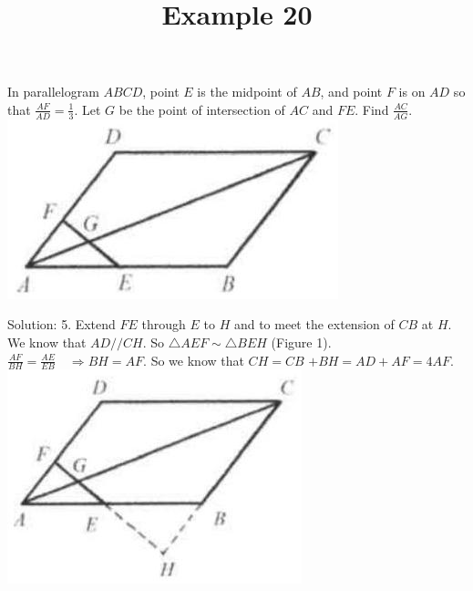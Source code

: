 \documentclass{article}
\title{Example 20}
\date{}
\begin{document}
\maketitle

In parallelogram \(A B C D\), point \(E\) is the midpoint of \(A B\), and point \(F\) is on \(A D\) so that \(\frac{A F}{A D}=\frac{1}{3}\). Let \(G\) be the point of intersection of \(A C\) and \(F E\). Find \(\frac{A C}{A G}\).\\
\centering
\includegraphics[width=\textwidth]{images/123.jpg}

Solution: 5.
Extend \(F E\) through \(E\) to \(H\) and to meet the extension of \(C B\) at \(H\).\\
We know that \(A D / / C H\). So \(\triangle A E F \sim \triangle B E H\) (Figure 1). \(\frac{A F}{B H}=\frac{A E}{E B} \quad \Rightarrow B H=A F\). So we know that \(C H=C B\) \(+B H=A D+A F=4 A F\).\\
\centering
\includegraphics[width=\textwidth]{images/123(1).jpg}
\end{document}
